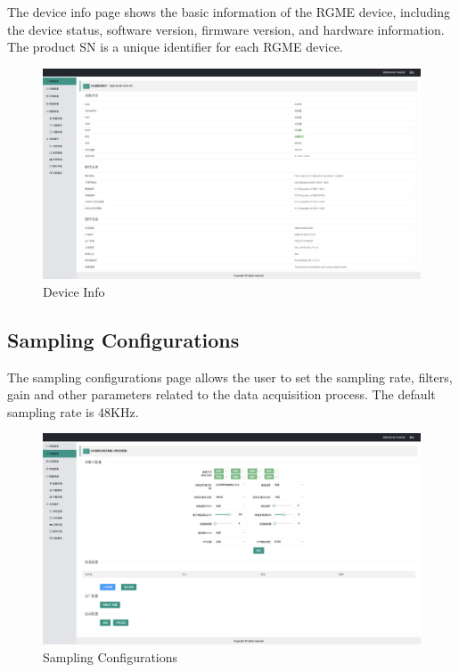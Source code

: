 \documentclass{article}
\begin{document}
The device info page shows the basic information of the RGME device, including the device status, software version, firmware version, and hardware information. The product SN is a unique identifier for each RGME device.

\begin{figure} [H]
    \centering
    \includegraphics[width=1\textwidth]{MMI_deviceinfo.png}
    \caption{Device Info}
\end{figure}

\subsection{Sampling Configurations}

The sampling configurations page allows the user to set the sampling rate, filters, gain and other parameters related to the data acquisition process. The default sampling rate is 48KHz.
\begin{figure} [H]
    \centering
    \includegraphics[width=1\textwidth]{MMI_sampleconfig.png}
    \caption{Sampling Configurations}
\end{figure}
\end{document}
